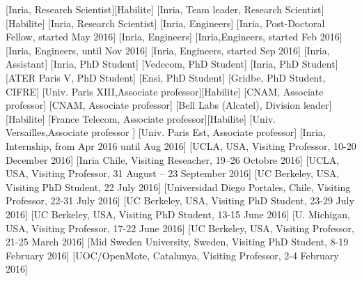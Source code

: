 \documentclass{ra2016}
\begin{document}
\begin{composition}
    [Inria, Research Scientist][Habilite]
    [Inria, Team leader, Research Scientist][Habilite]
    [Inria, Research Scientist]
    [Inria, Engineers]
    [Inria, Post-Doctoral Fellow, started May 2016]
    [Inria, Engineers]
    [Inria,Engineers, started Feb 2016]
    [Inria, Engineers, until Nov 2016]
    [Inria, Engineers, started Sep 2016]
    [Inria, Assistant]
    [Inria, PhD Student]
    [Vedecom, PhD Student]
    [Inria, PhD Student]
    [ATER Paris V, PhD Student]
    [Ensi, PhD Student]
    [Gridbe, PhD Student, CIFRE]
    [Univ. Paris XIII,Associate professor][Habilite]
    [CNAM,  Associate professor]
    [CNAM, Associate professor]
    [Bell Labs (Alcatel), Division leader][Habilite]
    [France Telecom, Associate professor][Habilite]
    [Univ. Versailles,Associate professor ]
    [Univ. Paris Est, Associate professor]
    [Inria, Internship, from Apr 2016 until Aug 2016]
    [UCLA, USA, Visiting Professor, 10-20 December 2016]
    [Inria Chile, Visiting Reseacher, 19–26 Octobre 2016]
    [UCLA, USA, Visiting Professor, 31 August -- 23 September 2016]
    [UC Berkeley, USA, Visiting PhD Student, 22 July 2016]
    [Universidad Diego Portales, Chile, Visiting Professor, 22-31 July 2016]
    [UC Berkeley, USA, Visiting PhD Student, 23-29 July 2016]
    [UC Berkeley, USA, Visiting PhD Student, 13-15 June 2016]
    [U. Michigan, USA, Visiting Professor, 17-22 June 2016]
    [UC Berkeley, USA, Visiting Professor, 21-25 March 2016]
    [Mid Sweden University, Sweden, Visiting PhD Student, 8-19 February 2016]
    [UOC/OpenMote, Catalunya, Visiting Professor, 2-4 February 2016]
\end{composition}
\end{document}

